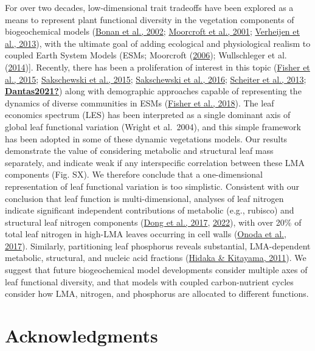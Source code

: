\documentclass[
  12pt,
  a4paper,
,tablecaptionabove
]{scrartcl}
\begin{document}
For over two decades, low-dimensional trait tradeoffs have been explored
as a means to represent plant functional diversity in the vegetation
components of biogeochemical models
(\protect\hyperlink{ref-Bonan2002}{Bonan et al., 2002};
\protect\hyperlink{ref-Moorcroft2001}{Moorcroft et al., 2001};
\protect\hyperlink{ref-Verheijen2013}{Verheijen et al., 2013}), with the
ultimate goal of adding ecological and physiological realism to coupled
Earth System Models (ESMs; Moorcroft
(\protect\hyperlink{ref-Moorcroft2006}{2006}); Wullschleger et al.
(\protect\hyperlink{ref-Wullschleger2014}{2014}){]}. Recently, there has
been a proliferation of interest in this topic
(\protect\hyperlink{ref-Fisher2015}{Fisher et al., 2015};
\protect\hyperlink{ref-Sakschewski2015}{Sakschewski et al., 2015};
\protect\hyperlink{ref-Sakschewski2016}{Sakschewski et al., 2016};
\protect\hyperlink{ref-Scheiter2013}{Scheiter et al., 2013};
\protect\hyperlink{ref-Dantas2021}{\textbf{Dantas2021?}}) along with
demographic approaches capable of representing the dynamics of diverse
communities in ESMs (\protect\hyperlink{ref-Fisher2018}{Fisher et al.,
2018}). The leaf economics spectrum (LES) has been interpreted as a
single dominant axis of global leaf functional variation (Wright et
al.~2004), and this simple framework has been adopted in some of these
dynamic vegetations models. Our results demonstrate the value of
considering metabolic and structural leaf mass separately, and indicate
weak if any interspecific correlation between these LMA components (Fig.
SX). We therefore conclude that a one-dimensional representation of leaf
functional variation is too simplistic. Consistent with our conclusion
that leaf function is multi-dimensional, analyses of leaf nitrogen
indicate significant independent contributions of metabolic (e.g.,
rubisco) and structural leaf nitrogen components
(\protect\hyperlink{ref-Dong2017}{Dong et al., 2017},
\protect\hyperlink{ref-Dong2022a}{2022}), with over 20\% of total leaf
nitrogen in high-LMA leaves occurring in cell walls
(\protect\hyperlink{ref-Onoda2017}{Onoda et al., 2017}). Similarly,
partitioning leaf phosphorus reveals substantial, LMA-dependent
metabolic, structural, and nucleic acid fractions
(\protect\hyperlink{ref-Hidaka2011}{Hidaka \& Kitayama, 2011}). We
suggest that future biogeochemical model developments consider multiple
axes of leaf functional diversity, and that models with coupled
carbon-nutrient cycles consider how LMA, nitrogen, and phosphorus are
allocated to different functions.

\hypertarget{acknowledgments}{%
\section{Acknowledgments}\label{acknowledgments}}
\end{document}
